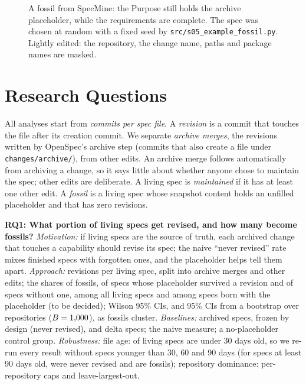\documentclass[10pt, conference]{IEEEtran}
\newcommand{\fp}[1]{\texttt{#1}}
\begin{document}
\begin{figure}[t]

\caption{A fossil from SpecMine: the Purpose still holds the archive placeholder, while the
requirements are complete. The spec was chosen at random with a fixed seed by
\fp{src/s05\_example\_fossil.py}. Lightly edited: the repository, the change name, paths and
package names are masked.}
\label{fig:example}
\end{figure}

\section{Research Questions}
\label{sec:research-idea}

All analyses start from \emph{commits per spec file}. A \emph{revision} is a
commit that touches the file after its creation commit. We separate
\emph{archive merges}, the revisions written by OpenSpec's archive step (commits that also create a file under
\fp{changes/archive/}), from other edits. An archive merge follows automatically from
archiving a change, so it says little about whether anyone chose to maintain the spec;
other edits are deliberate. A living spec is \emph{maintained} if it has at least one
other edit. A
\emph{fossil} is a living spec whose snapshot content holds an unfilled placeholder and
that has zero revisions.

\textbf{RQ1: What portion of living specs get revised, and how many become fossils?}
\emph{Motivation:} if living specs are the source of truth, each archived change that
touches a capability should revise its spec; the naive ``never revised'' rate mixes
finished specs with forgotten ones, and the placeholder helps tell them apart.
\emph{Approach:} revisions per living spec, split into archive merges and other edits; the
shares of fossils, of specs whose placeholder survived a revision and of specs without one,
among all living specs and among specs born with the placeholder (to be decided); Wilson
95\% CIs, and 95\% CIs from a bootstrap over repositories ($B=1{,}000$), as fossils cluster.
\emph{Baselines:} archived specs, frozen by design (\pctArchivedNeverRevised never
revised), and delta specs; the naive measure; a no-placeholder control group.
\emph{Robustness:} file age: \pctLivingYoungThirty of living specs are under 30 days old,
so we re-run every result without specs younger than 30, 60 and 90 days (for specs at
least 90 days old, \pctNeverRevisedOldNinety were never revised and \pctFossilOldNinety are
fossils); repository dominance: per-repository caps and leave-largest-out.
\end{document}
